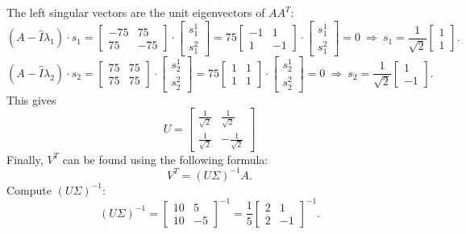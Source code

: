 \documentclass[14pt, notitlepage]{article}
\begin{document}
The left singular vectors are the unit eigenvectors of $AA^T$:
\[
    \left(A - \hat{I}\lambda_1 \right) \cdot s_1 = \begin{bmatrix}
        -75 &  75 \\ 
        75  & -75
    \end{bmatrix} \cdot
    \begin{bmatrix} s_1^1 \\ s_1^2 \end{bmatrix} = 
    75 \begin{bmatrix}
        -1 & 1 \\
        1 & -1
    \end{bmatrix} \cdot
    \begin{bmatrix} s_1^1 \\ s_1^2 \end{bmatrix} = 0 \ \Rightarrow \
    s_1 = \frac{1}{\sqrt{2}}\begin{bmatrix} 1 \\ 1 \end{bmatrix}.
\]
\[
    \left(A - \hat{I}\lambda_2 \right) \cdot s_2 = \begin{bmatrix}
        75 & 75 \\ 
        75 & 75
    \end{bmatrix} \cdot
    \begin{bmatrix} s_2^1 \\ s_2^2 \end{bmatrix} = 
    75 \begin{bmatrix}
        1 & 1 \\
        1 & 1
    \end{bmatrix} \cdot
    \begin{bmatrix} s_2^1 \\ s_2^2 \end{bmatrix} = 0 \ \Rightarrow \
    s_2 = \frac{1}{\sqrt{2}}\begin{bmatrix} 1 \\ -1 \end{bmatrix}.
\]
This gives
\[
    U = \begin{bmatrix}
        \frac{1}{\sqrt{2}} &  \frac{1}{\sqrt{2}} \\
        \frac{1}{\sqrt{2}} & -\frac{1}{\sqrt{2}}
    \end{bmatrix}
\]
Finally, $V^T$ can be found using the following formula:
\[
    V^T = \left(U\Sigma\right)^{-1}A.
\]
Compute $\left(U\Sigma\right)^{-1}$:
\[
    \left(U\Sigma\right)^{-1} = \begin{bmatrix}
        10 &  5 \\
        10 & -5
    \end{bmatrix}^{-1} = 
    \frac 15 \begin{bmatrix}
        2 & 1 \\
        2 & -1
    \end{bmatrix}^{-1}.
\]
\end{document}
